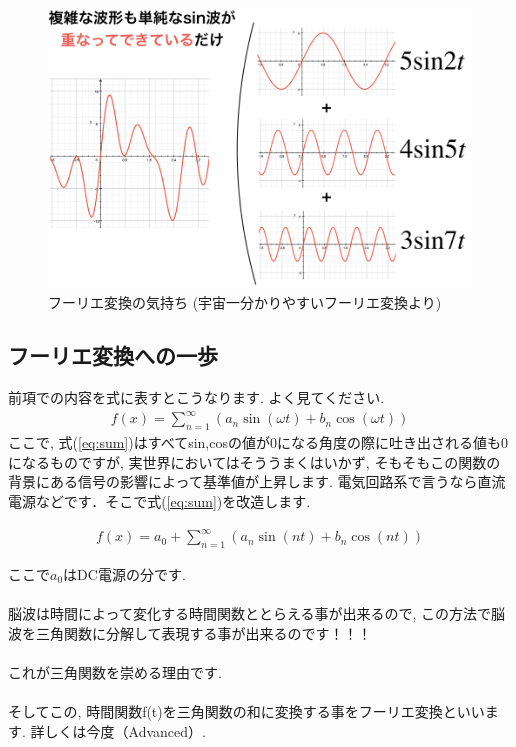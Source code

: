 \documentclass[11pt,a4paper]{jreport}
\begin{document}
\begin{figure}[H]
\label{im:furier}
  \centering
  \includegraphics[width=120mm,bb=0 0 974 643]{../figures/furier.png}
  \caption{フーリエ変換の気持ち (宇宙一分かりやすいフーリエ変換より)}
\end{figure}

\subsection{フーリエ変換への一歩}
前項での内容を式に表すとこうなります. よく見てください.
\begin{eqnarray}
f(x) = \sum_{n=1}^\infty ({a_n \sin(\omega t) + b_n\cos(\omega t)}
\label{eq:sum})
\end{eqnarray}
ここで, 式(\ref{eq:sum})はすべてsin,cosの値が0になる角度の際に吐き出される値も0になるものですが, 実世界においてはそううまくはいかず, そもそもこの関数の背景にある信号の影響によって基準値が上昇します. 電気回路系で言うなら直流電源などです．そこで式(\ref{eq:sum})を改造します.

\begin{eqnarray}
f(x) = a_0 + \sum_{n=1}^\infty ({a_n \sin(nt) + b_n\cos(nt)}
\label{eq:fixed_sum})
\end{eqnarray}

ここで$a_0$はDC電源の分です.\\
\\
脳波は時間によって変化する時間関数ととらえる事が出来るので, この方法で脳波を三角関数に分解して表現する事が出来るのです！！！\\
\\
これが三角関数を崇める理由です.\\
\\
そしてこの, 時間関数f(t)を三角関数の和に変換する事をフーリエ変換といいます. 詳しくは今度（Advanced）.\\
\end{document}
